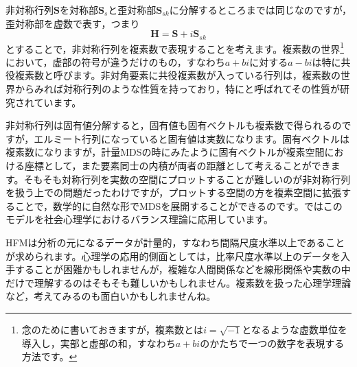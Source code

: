 \documentclass{ltjsbook}
\begin{document}
非対称行列$\bm{S}$を対称部$\bm{S}_s$と歪対称部$\bm{S}_{sk}$に分解するところまでは同じなのですが，歪対称部を虚数で表す，つまり
\[ \bm{H} = \bm{S} + i\bm{S}_{sk} \]
とすることで，非対称行列を複素数で表現することを考えます。複素数の世界\footnote{念のために書いておきますが，複素数とは$i=\sqrt{-1}$となるような虚数単位を導入し，実部と虚部の和，すなわち$a+bi$のかたちで一つの数字を表現する方法です。}において，虚部の符号が違うだけのもの，すなわち$a + bi$に対する$a - bi$は特に共役複素数と呼びます。非対角要素に共役複素数が入っている行列は，複素数の世界からみれば対称行列のような性質を持っており，特にと呼ばれてその性質が研究されています。

非対称行列は固有値分解すると，固有値も固有ベクトルも複素数で得られるのですが，エルミート行列になっていると固有値は実数になります。固有ベクトルは複素数になりますが，計量MDSの時にみたように固有ベクトルが複素空間における座標として，また要素同士の内積が両者の距離として考えることができます。そもそも対称行列を実数の空間にプロットすることが難しいのが非対称行列を扱う上での問題だったわけですが，プロットする空間の方を複素空間に拡張することで，数学的に自然な形でMDSを展開することができるのです。\textcite{kosugi2004}ではこのモデルを社会心理学におけるバランス理論に応用しています。

HFMは分析の元になるデータが計量的，すなわち間隔尺度水準以上であることが求められます。心理学の応用的側面としては，比率尺度水準以上のデータを入手することが困難かもしれませんが，複雑な人間関係などを線形関係や実数の中だけで理解するのはそもそも難しいかもしれません。複素数を扱った心理学理論など，考えてみるのも面白いかもしれませんね。
\end{document}
